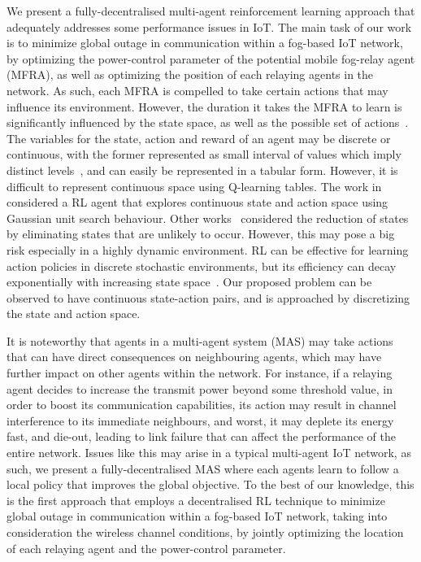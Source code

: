 \documentclass[journal]{IEEEtran}
\begin{document}
We present a fully-decentralised multi-agent reinforcement learning approach that adequately addresses some performance issues in IoT.
The main task of our work is to minimize global outage in communication within a fog-based IoT network, by optimizing the power-control parameter of the potential mobile fog-relay agent (MFRA), as well as optimizing the position of each relaying agents in the network. As such, each MFRA is compelled to take certain actions that may influence its environment. However, the duration it takes the MFRA to learn is significantly influenced by the state space, as well as the possible set of actions~\cite{Dusparic2009}. The variables for the state, action and reward of an agent may be discrete or continuous, with the former represented as small interval of values which imply distinct levels~\cite{Yau2012}, and can easily be represented in a tabular form. However, it is difficult to represent continuous space using Q-learning tables. The work in \cite{Vucevic2007} considered a RL agent that explores continuous state and action space using Gaussian unit search behaviour. Other works~\cite{Dusparic2009, Cuayahuitl2006} considered the reduction of states by eliminating states that are unlikely to occur. However, this may pose a big risk especially in a highly dynamic environment. RL can be effective for learning action policies in discrete stochastic environments, but its efficiency can decay exponentially with increasing state space~\cite{Uther1998}. Our proposed problem can be observed to have continuous state-action pairs, and is approached by discretizing the state and action space.

It is noteworthy that agents in a multi-agent system (MAS) may take actions that can have direct consequences on neighbouring agents, which may have further impact on other agents within the network. For instance, if a relaying agent decides to increase the transmit power beyond some threshold value, in order to boost its communication capabilities, its action may result in channel interference to its immediate neighbours, and worst, it may deplete its energy fast, and die-out, leading to link failure that can affect the performance of the entire network. Issues like this may arise in a typical multi-agent IoT network, as such, we present a fully-decentralised MAS where each agents learn to follow a local policy that improves the global objective. To the best of our knowledge, this is the first approach that employs a decentralised RL technique to minimize global outage in communication within a fog-based IoT network, taking into consideration the wireless channel conditions, by jointly optimizing the location of each relaying agent and the power-control parameter.
\end{document}
